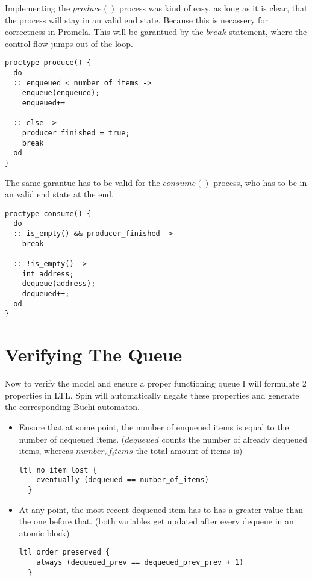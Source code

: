 \documentclass{article}
\begin{document}
Implementing the $produce()$ process was kind of easy, as long as it is clear, that the process will stay in an valid end state. 
Because this is necassery for correctness in Promela.
This will be garantued by the $break$ statement, where the control flow jumps out of the loop.

\begin{lstlisting}[language=Promela]
proctype produce() {
  do
  :: enqueued < number_of_items -> 
    enqueue(enqueued);
    enqueued++

  :: else -> 
    producer_finished = true;
    break
  od
}
\end{lstlisting}

The same garantue has to be valid for the $consume()$ process, who has to be in an valid end state at the end.

\begin{lstlisting}[language=Promela]
proctype consume() {
  do
  :: is_empty() && producer_finished ->
    break

  :: !is_empty() ->
    int address;
    dequeue(address);
    dequeued++;
  od
}
\end{lstlisting}


\section{Verifying The Queue}

Now to verify the model and ensure a proper functioning queue I will formulate 2 properties in LTL. Spin will automatically negate these properties and generate the corresponding B\"uchi automaton. 

\begin{itemize}
  \item Ensure that at some point, the number of enqueued items is equal to the number of dequeued items. ($dequeued$ counts the number of already dequeued items, whereas $number_of_items$ the total amount of items is)
  \begin{lstlisting}[language=Promela]
  ltl no_item_lost { 
    eventually (dequeued == number_of_items) 
  } 
  \end{lstlisting}
  \item At any point, the most recent dequeued item has to has a greater value than the one before that. (both variables get updated after every dequeue in an atomic block)
  \begin{lstlisting}[language=Promela]
  ltl order_preserved { 
    always (dequeued_prev == dequeued_prev_prev + 1) 
  }
  \end{lstlisting}
\end{itemize}
\end{document}
